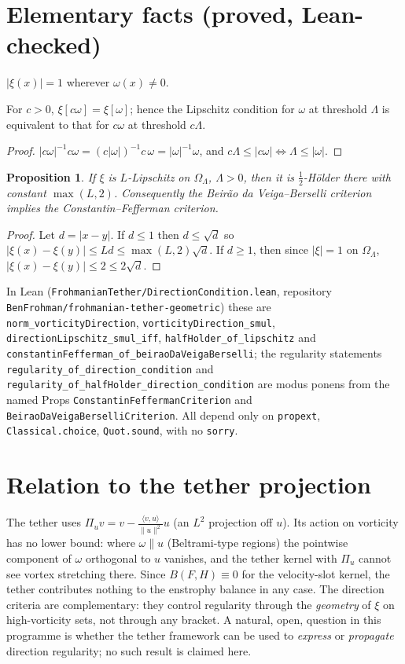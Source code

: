 \documentclass[11pt]{article}
\newtheorem{proposition}[theorem]{Proposition}
\theoremstyle{definition}\newtheorem{definition}[theorem]{Definition}\newtheorem{remark}[theorem]{Remark}
\begin{document}
\section{Elementary facts (proved, Lean-checked)}
\begin{lemma}$|\xi(x)|=1$ wherever $\omega(x)\neq0$.\end{lemma}
\begin{lemma}For $c>0$, $\xi[c\omega]=\xi[\omega]$; hence the Lipschitz condition for $\omega$ at threshold $\Lambda$ is equivalent to that for $c\omega$ at threshold $c\Lambda$.\end{lemma}
\begin{proof}$|c\omega|^{-1}c\omega=(c|\omega|)^{-1}c\,\omega=|\omega|^{-1}\omega$, and $c\Lambda\le|c\omega|\iff\Lambda\le|\omega|$.\end{proof}
\begin{proposition}If $\xi$ is $L$-Lipschitz on $\Omega_\Lambda$, $\Lambda>0$, then it is $\tfrac12$-H\"older there with constant $\max(L,2)$. Consequently the Beir\~ao da Veiga--Berselli criterion implies the Constantin--Fefferman criterion.\end{proposition}
\begin{proof}Let $d=|x-y|$. If $d\le1$ then $d\le\sqrt d$ so $|\xi(x)-\xi(y)|\le Ld\le\max(L,2)\sqrt d$. If $d\ge1$, then since $|\xi|=1$ on $\Omega_\Lambda$, $|\xi(x)-\xi(y)|\le2\le2\sqrt d$.\end{proof}
In Lean (\texttt{FrohmanianTether/DirectionCondition.lean}, repository \texttt{BenFrohman/frohmanian-tether-geometric}) these are \texttt{norm\_vorticityDirection}, \texttt{vorticityDirection\_smul}, \texttt{directionLipschitz\_smul\_iff}, \texttt{halfHolder\_of\_lipschitz} and \texttt{constantinFefferman\_of\_beiraoDaVeigaBerselli}; the regularity statements \texttt{regularity\_of\_direction\_condition} and \texttt{regularity\_of\_halfHolder\_direction\_condition} are modus ponens from the named Props \texttt{ConstantinFeffermanCriterion} and \texttt{BeiraoDaVeigaBerselliCriterion}. All depend only on \texttt{propext}, \texttt{Classical.choice}, \texttt{Quot.sound}, with no \texttt{sorry}.

\section{Relation to the tether projection}
The tether uses $\Pi_u v=v-\frac{\langle v,u\rangle}{\|u\|^2}u$ (an $L^2$ projection off $u$). Its action on vorticity has no lower bound: where $\omega\parallel u$ (Beltrami-type regions) the pointwise component of $\omega$ orthogonal to $u$ vanishes, and the tether kernel with $\Pi_u$ cannot see vortex stretching there. Since $B(F,H)\equiv0$ for the velocity-slot kernel, the tether contributes nothing to the enstrophy balance in any case. The direction criteria are complementary: they control regularity through the \emph{geometry} of $\xi$ on high-vorticity sets, not through any bracket. A natural, open, question in this programme is whether the tether framework can be used to \emph{express} or \emph{propagate} direction regularity; no such result is claimed here.
\end{document}
